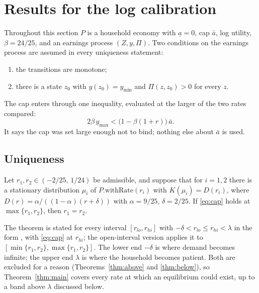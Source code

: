 \section{Results for the log calibration}\label{sec:main}

Throughout this section $P$ is a household economy with $\underline a=0$, cap $\bar a$, log
utility, $\beta=24/25$, and an earnings process $(Z,y,\Pi)$. Two conditions on the earnings
process are assumed in every uniqueness statement:
\begin{enumerate}[label=(E\arabic*)]
  \item\label{E1} the transitions are monotone;
  \item\label{E2} there is a state $z_0$ with $y(z_0)=y_{\min}$ and $\Pi(z,z_0)>0$ for every $z$.
\end{enumerate}
The cap enters through one inequality, evaluated at the larger of the two rates compared:
\begin{equation}\label{eq:cap}
  2\beta\,y_{\max}<\bigl(1-\beta(1+r)\bigr)\,\bar a .
\end{equation}
It says the cap was set large enough not to bind; nothing else about $\bar a$ is used.

\subsection{Uniqueness}

\begin{theorem}[Aiyagari at $\mu=1$: the equilibrium rate is unique on $(-\delta,\lambda)$]
\label{thm:main}
Let $r_1,r_2\in(-2/25,\,1/24)$ be admissible, and suppose that for $i=1,2$ there is a stationary
distribution $\mu_i$ of $P.\text{withRate}(r_i)$ with $K(\mu_i)=D(r_i)$, where
$D(r)=\alpha/((1-\alpha)(r+\delta))$ with $\alpha=9/25$, $\delta=2/25$. If \eqref{eq:cap} holds at
$\max\{r_1,r_2\}$, then $r_1=r_2$.
\end{theorem}

The theorem is stated for every interval $[r_{lo},r_{hi}]$ with $-\delta<r_{lo}\le r_{hi}<\lambda$
in the form , with \eqref{eq:cap} at $r_{hi}$;
the open-interval version applies it to $[\min\{r_1,r_2\},\max\{r_1,r_2\}]$. The lower end
$-\delta$ is where demand becomes infinite; the upper end $\lambda$ is where the household becomes
patient. Both are excluded for a reason (Theorems~\ref{thm:above} and \ref{thm:below}), so
Theorem~\ref{thm:main} covers every rate at which an equilibrium could exist, up to a band above
$\lambda$ discussed below.

